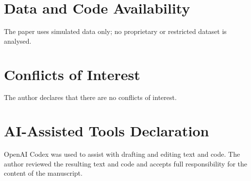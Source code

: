 \section*{Data and Code Availability}

The paper uses simulated data only; no proprietary or restricted dataset is
analysed.

\replicationstatement

\section*{Conflicts of Interest}

The author declares that there are no conflicts of interest.

\section*{AI-Assisted Tools Declaration}

OpenAI Codex was used to assist with drafting and editing text and code. The
author reviewed the resulting text and code and accepts full responsibility for
the content of the manuscript.
